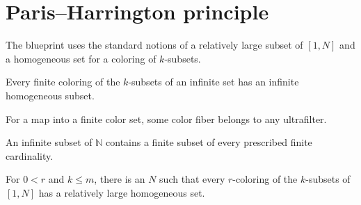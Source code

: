 \section{Paris--Harrington principle}

\begin{definition}
\label{def:ph-large}
\leanok
The blueprint uses the standard notions of a relatively large subset of $[1,N]$ and a homogeneous set for a coloring of $k$-subsets.
\end{definition}

\begin{theorem}
\label{thm:ph-infinite-ramsey}
\leanok
Every finite coloring of the $k$-subsets of an infinite set has an infinite homogeneous subset.
\end{theorem}

\begin{lemma}
\label{lem:ph-ultrafilter}
\leanok
For a map into a finite color set, some color fiber belongs to any ultrafilter.
\end{lemma}

\begin{lemma}
\label{lem:ph-finset}
\leanok
An infinite subset of $\mathbb N$ contains a finite subset of every prescribed finite cardinality.
\end{lemma}

\begin{theorem}
\label{thm:paris-harrington}
\leanok
{}
For $0<r$ and $k\le m$, there is an $N$ such that every $r$-coloring of the $k$-subsets of $[1,N]$ has a relatively large homogeneous set.
\end{theorem}
